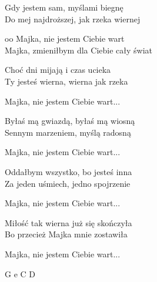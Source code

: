 \begin{text}
	Gdy jestem sam, myślami biegnę\\
	Do mej najdroższej, jak rzeka wiernej

	\vin oo Majka, nie jestem Ciebie wart\\
	\vin Majka, zmieniłbym dla Ciebie cały świat

	Choć dni mijają i czas ucieka\\
	Ty jesteś wierna, wierna jak rzeka

	\vin Majka, nie jestem Ciebie wart...

	Byłaś mą gwiazdą, byłaś mą wiosną\\
	Sennym marzeniem, myślą radosną

	\vin Majka, nie jestem Ciebie wart...

	Oddałbym wszystko, bo jesteś inna\\
	Za jeden uśmiech, jedno spojrzenie

	\vin Majka, nie jestem Ciebie wart...

	Miłość tak wierna już się skończyła\\
	Bo przecież Majka mnie zostawiła

	\vin Majka, nie jestem Ciebie wart...
	
\end{text}
\begin{chord}
    G e C D
\end{chord}
